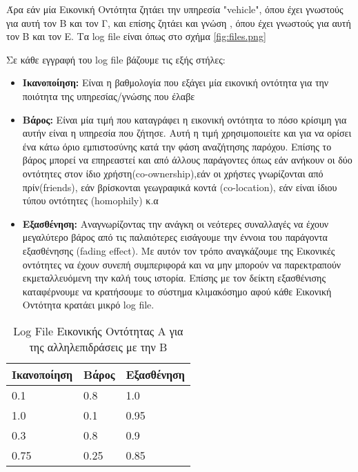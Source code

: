 Άρα εάν μία Εικονική Οντότητα ζητάει την υπηρεσία "vehicle", όπου έχει γνωστούς για αυτή τον Β και τον Γ, και επίσης ζητάει και γνώση , όπου έχει γνωστούς για αυτή τον Β και τον Ε. Τα log file είναι όπως στο σχήμα \ref{fig:files.png}
\newpage
{}


Σε κάθε εγγραφή του log file βάζουμε τις εξής στήλες:
\begin{itemize}

\item \textbf{Ικανοποίηση:} Είναι η βαθμολογία που εξάγει μία εικονική οντότητα για την ποιότητα της υπηρεσίας/γνώσης που έλαβε

\item \textbf{Βάρος:} Είναι μία τιμή που καταγράφει η εικονική οντότητα το πόσο κρίσιμη για αυτήν είναι η υπηρεσία που ζήτησε. Αυτή η τιμή χρησιμοποιείτε και για να ορίσει ένα κάτω όριο εμπιστοσύνης κατά την φάση αναζήτησης παρόχου. Επίσης το βάρος μπορεί να επηρεαστεί και από άλλους παράγοντες όπως εάν ανήκουν οι δύο οντότητες στον ίδιο χρήστη(co-ownership),εάν οι χρήστες γνωρίζονται από πρίν(friends), εάν βρίσκονται γεωγραφικά κοντά (co-location), εάν είναι ίδιου τύπου οντότητες (homophily) κ.α

\item \textbf{Εξασθένηση:} Αναγνωρίζοντας την ανάγκη οι νεότερες συναλλαγές να έχουν μεγαλύτερο βάρος από τις παλαιότερες εισάγουμε την έννοια του παράγοντα εξασθένησης (fading effect). Με αυτόν τον τρόπο αναγκάζουμε της Εικονικές οντότητες να έχουν συνεπή συμπεριφορά και να μην μπορούν να παρεκτραπούν εκμεταλλευόμενη την καλή τους ιστορία. Επίσης με τον δείκτη εξασθένισης καταφέρνουμε να κρατήσουμε το σύστημα κλιμακόσημο αφού κάθε Εικονική Οντότητα κρατάει μικρό log file.

\end{itemize}

\begin{table}[H]
    \centering
    \begin{tabular}{ | l | l | l | }
        \hline
        Ικανοποίηση & Βάρος & Εξασθένηση \\ \hline \hline
        0.1 & 0.8 & 1.0  \\ \hline
        1.0 & 0.1 & 0.95  \\ \hline
        0.3 & 0.8 & 0.9  \\ \hline
        0.75 & 0.25 & 0.85  \\ \hline
    \end{tabular}
    \caption{Log File Εικονικής Οντότητας Α για της αλληλεπιδράσεις με την Β}
    \label{tab:log file}
\end{table}

